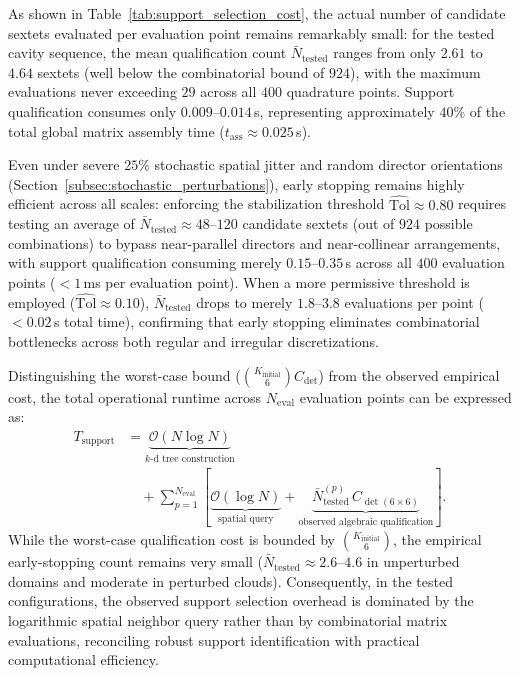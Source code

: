 \documentclass[preprint,12pt]{elsarticle}
\begin{document}
As shown in Table~\ref{tab:support_selection_cost}, the actual number of candidate sextets evaluated per evaluation point remains remarkably small: for the tested cavity sequence, the mean qualification count $\bar{N}_{\mathrm{tested}}$ ranges from only $2.61$ to $4.64$ sextets (well below the combinatorial bound of $924$), with the maximum evaluations never exceeding $29$ across all $400$ quadrature points. Support qualification consumes only $0.009\text{--}0.014$\,s, representing approximately $40\%$ of the total global matrix assembly time ($t_{\mathrm{ass}} \approx 0.025$\,s).

Even under severe $25\%$ stochastic spatial jitter and random director orientations (Section~\ref{subsec:stochastic_perturbations}), early stopping remains highly efficient across all scales: enforcing the stabilization threshold $\widehat{\mathrm{Tol}} \approx 0.80$ requires testing an average of $\bar{N}_{\mathrm{tested}} \approx 48\text{--}120$ candidate sextets (out of $924$ possible combinations) to bypass near-parallel directors and near-collinear arrangements, with support qualification consuming merely $0.15\text{--}0.35$\,s across all $400$ evaluation points ($< 1$\,ms per evaluation point). When a more permissive threshold is employed ($\widehat{\mathrm{Tol}} \approx 0.10$), $\bar{N}_{\mathrm{tested}}$ drops to merely $1.8\text{--}3.8$ evaluations per point ($< 0.02$\,s total time), confirming that early stopping eliminates combinatorial bottlenecks across both regular and irregular discretizations.

Distinguishing the worst-case bound ($\binom{K_{\mathrm{initial}}}{6} C_{\det}$) from the observed empirical cost, the total operational runtime across $N_{\mathrm{eval}}$ evaluation points can be expressed as:
\begin{align}
    T_{\mathrm{support}} & = \underbrace{\mathcal{O}(N \log N)}_{\text{$k$-d tree construction}} \nonumber                                                                                                                                                 \\
                         & \quad + \sum_{p=1}^{N_{\mathrm{eval}}} \left[ \underbrace{\mathcal{O}(\log N)}_{\text{spatial query}} + \underbrace{\bar{N}_{\mathrm{tested}}^{(p)} \, C_{\det(6 \times 6)}}_{\text{observed algebraic qualification}} \right].
    \label{eq:support_total_complexity}
\end{align}
While the worst-case qualification cost is bounded by $\binom{K_{\mathrm{initial}}}{6}$, the empirical early-stopping count remains very small ($\bar{N}_{\mathrm{tested}} \approx 2.6\text{--}4.6$ in unperturbed domains and moderate in perturbed clouds). Consequently, in the tested configurations, the observed support selection overhead is dominated by the logarithmic spatial neighbor query rather than by combinatorial matrix evaluations, reconciling robust support identification with practical computational efficiency.
\end{document}
